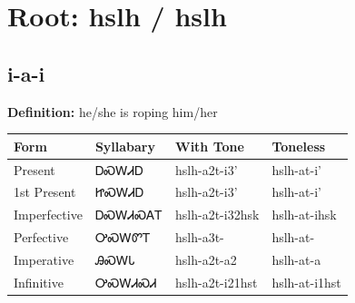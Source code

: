 \documentclass{article}%
\begin{document}
%
\normalsize%
\section*{Root: hslh / hslh}%
\subsection*{i-a-i}%
\textbf{Definition: }%
he/she is roping him/her%
\\[0.5em]%
\begin{tabular}{|l|l|l|l|}%
\hline%
\textbf{Form}&\textbf{Syllabary}&\textbf{With Tone}&\textbf{Toneless}\\%
\hline%
Present&ᎠᏍᎳᏗᎠ&hslh{-}a2t{-}i3'&hslh{-}at{-}i'\\%
1st Present&ᏥᏍᎳᏗᎠ&hslh{-}a2t{-}i3'&hslh{-}at{-}i'\\%
Imperfective&ᎠᏍᎳᏗᏍᎪᎢ&hslh{-}a2t{-}i32hsk&hslh{-}at{-}ihsk\\%
Perfective&ᎤᏍᎳᏛᎢ&hslh{-}a3t{-}&hslh{-}at{-}\\%
Imperative&ᎯᏍᎳᏓ&hslh{-}a2t{-}a2&hslh{-}at{-}a\\%
Infinitive&ᎤᏍᎳᏗᏍᏗ&hslh{-}a2t{-}i21hst&hslh{-}at{-}i1hst\\%
\hline%
\end{tabular}%
\\[1em]%
\end{document}

